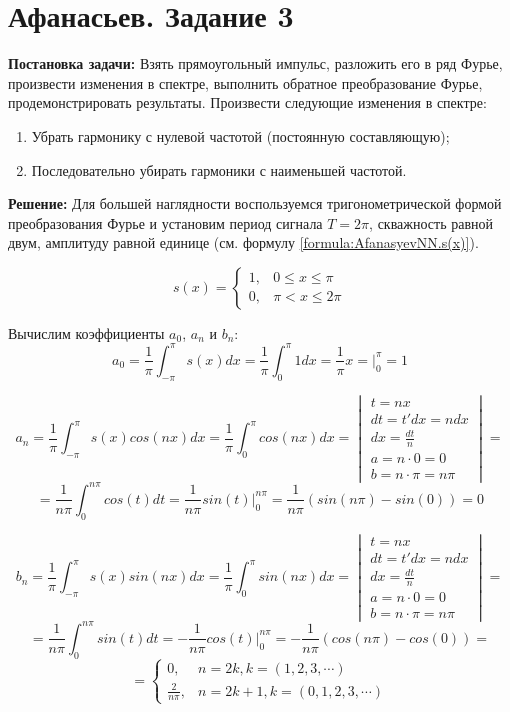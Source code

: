 \section{Афанасьев. Задание 3}

\textbf{Постановка задачи:}
Взять прямоугольный импульс, разложить его в ряд Фурье,
произвести изменения в спектре, выполнить обратное преобразование
Фурье, продемонстрировать результаты.
Произвести следующие изменения в спектре:

\begin{enumerate}
  \item Убрать гармонику с нулевой частотой (постоянную составляющую);
  \item Последовательно убирать гармоники с наименьшей частотой.
\end{enumerate}

\textbf{Решение:}
Для большей наглядности воспользуемся тригонометрической формой
преобразования Фурье и установим период сигнала $T=2 \pi$,
скважность равной двум, амплитуду равной единице
(см. формулу \ref{formula:AfanasyevNN.s(x)}).
   
\begin{equation}
\label{formula:AfanasyevNN.s(x)}
s(x)=
\begin{cases}
1, & 0 \leq x \leq \pi \\
0, & \pi < x \leq 2 \pi
\end{cases}
\end{equation}

Вычислим коэффициенты $a_0$, $a_n$ и $b_n$:
$$
a_0= \frac{1}{ \pi} \int_{- \pi}^{ \pi}{s(x) dx}=
\frac{1}{ \pi} \int_{0}^{ \pi}{1 dx}=
\frac{1}{ \pi} x= \bigg |_{0}^{ \pi}=1
$$

$$
a_n= \frac{1}{ \pi} \int_{- \pi}^{ \pi}{s(x) cos(n x) dx}=
\frac{1}{ \pi} \int_{0}^{ \pi}{cos(n x) dx}=
\begin{vmatrix}
t=n x \\
dt=t' dx=n dx \\
dx= \frac{dt}{n} \\
a=n \cdot 0=0 \\
b=n \cdot \pi=n \pi 
\end{vmatrix}=
$$
$$
= \frac{1}{n \pi} \int_{0}^{n \pi}{ cos(t) dt}=
\frac{1}{n \pi} sin(t) \bigg |_{0}^{n \pi}=
\frac{1}{n \pi} (sin(n \pi) - sin(0))=0
$$

$$
b_n= \frac{1}{ \pi} \int_{- \pi}^{ \pi}{s(x) sin(n x) dx}=
\frac{1}{ \pi} \int_{0}^{ \pi}{sin(n x) dx}=
\begin{vmatrix}
t=n x \\
dt=t' dx=n dx \\
dx= \frac{dt}{n} \\
a=n \cdot 0=0 \\
b=n \cdot \pi=n \pi 
\end{vmatrix}=
$$
$$
= \frac{1}{n \pi} \int_{0}^{n \pi}{ sin(t) dt}=
- \frac{1}{n \pi} cos(t) \bigg |_{0}^{n \pi}=
- \frac{1}{n \pi} (cos(n \pi) - cos(0))=
$$
$$
=
\begin{cases}
0, & n=2 k, k=(1,2,3, \cdots) \\
\frac{2}{n \pi}, & n=2 k + 1, k=(0,1,2,3, \cdots)
\end{cases}
$$

